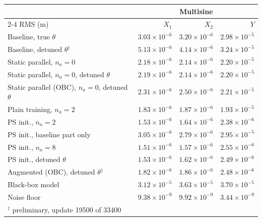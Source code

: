 \setlength{\tabcolsep}{3pt}
\begin{tabular}{l r r r}
\toprule
 & \multicolumn{3}{c}{Multisine}\\
\cmidrule(lr){2-4}
RMS (m) & $X_1$ & $X_2$ & $Y$\\
\midrule
Baseline, true $\theta$ & $3.03\times10^{-6}$ & $3.20\times10^{-6}$ & $2.98\times10^{-5}$\\
Baseline, detuned $\theta$$^\dagger$ & $5.13\times10^{-6}$ & $4.14\times10^{-6}$ & $3.24\times10^{-5}$\\
Static parallel, $n_a{=}0$ & $2.18\times10^{-6}$ & $2.14\times10^{-6}$ & $2.20\times10^{-5}$\\
Static parallel, $n_a{=}0$, detuned $\theta$ & $2.19\times10^{-6}$ & $2.14\times10^{-6}$ & $2.20\times10^{-5}$\\
Static parallel (OBC), $n_a{=}0$, detuned $\theta$ & $2.31\times10^{-6}$ & $2.50\times10^{-6}$ & $2.21\times10^{-5}$\\
Plain training, $n_a{=}2$ & $1.83\times10^{-6}$ & $1.87\times10^{-6}$ & $1.93\times10^{-5}$\\
PS init., $n_a{=}2$ & $1.53\times10^{-6}$ & $1.64\times10^{-6}$ & $2.38\times10^{-6}$\\
PS init., baseline part only & $3.05\times10^{-6}$ & $2.79\times10^{-6}$ & $2.95\times10^{-5}$\\
PS init., $n_a{=}8$ & $1.51\times10^{-6}$ & $1.57\times10^{-6}$ & $2.55\times10^{-6}$\\
PS init., detuned $\theta$ & $1.53\times10^{-6}$ & $1.62\times10^{-6}$ & $2.49\times10^{-6}$\\
\midrule
Augmented (OBC), detuned $\theta$$^\dagger$ & $1.82\times10^{-6}$ & $1.86\times10^{-6}$ & $2.48\times10^{-6}$\\
\midrule
Black-box model & $3.12\times10^{-5}$ & $3.63\times10^{-5}$ & $3.70\times10^{-5}$\\
\midrule
Noise floor & $9.38\times10^{-9}$ & $9.92\times10^{-9}$ & $3.44\times10^{-9}$\\
\bottomrule
\multicolumn{4}{l}{\footnotesize $^\dagger$ preliminary, update 19500 of 33400}\\
\end{tabular}
